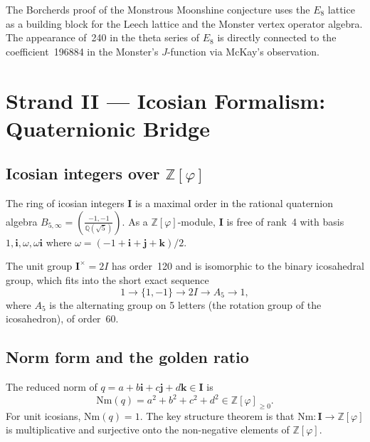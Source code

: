 The Borcherds proof of the Monstrous Moonshine conjecture
\cite{borcherds1992monstrous_moonshine} uses the \(E_8\) lattice as
a building block for the Leech lattice and the Monster vertex operator
algebra.  The appearance of~240 in the theta series of \(E_8\) is
directly connected to the coefficient~196884 in the Monster's
\(J\)-function via McKay's observation.

\section{Strand II — Icosian Formalism: Quaternionic Bridge}
\label{sec:e8-strand2}

\subsection{Icosian integers over \texorpdfstring{$\mathbb{Z}[\varphi]$}{ℤ[φ]}}
\label{subsec:strand2-icosian-ring}

The ring of icosian integers \(\mathbf{I}\) is a maximal order in the
rational quaternion algebra \(B_{5,\infty} = \left(\frac{-1,-1}
{\mathbb{Q}(\sqrt{5})}\right)\).  As a \(\mathbb{Z}[\varphi]\)-module,
\(\mathbf{I}\) is free of rank~4 with basis
\(1, \mathbf{i}, \omega, \omega\mathbf{i}\) where \(\omega = (-1 +
\mathbf{i} + \mathbf{j} + \mathbf{k})/2\).

The unit group \(\mathbf{I}^\times = 2I\) has order~120 and is
isomorphic to the binary icosahedral group, which fits into the short
exact sequence
\[
  1 \to \{1,-1\} \to 2I \to A_5 \to 1,
\]
where \(A_5\) is the alternating group on 5 letters (the rotation
group of the icosahedron), of order~60.

\subsection{Norm form and the golden ratio}
\label{subsec:strand2-normform}

The reduced norm of \(q = a + b\mathbf{i} + c\mathbf{j} + d\mathbf{k}
\in \mathbf{I}\) is
\[
  \mathrm{Nm}(q) = a^2 + b^2 + c^2 + d^2 \in \mathbb{Z}[\varphi]_{\geq 0}.
\]
For unit icosians, \(\mathrm{Nm}(q) = 1\).  The key structure theorem
is that \(\mathrm{Nm}: \mathbf{I} \to \mathbb{Z}[\varphi]\) is
multiplicative and surjective onto the non-negative elements of
\(\mathbb{Z}[\varphi]\).

